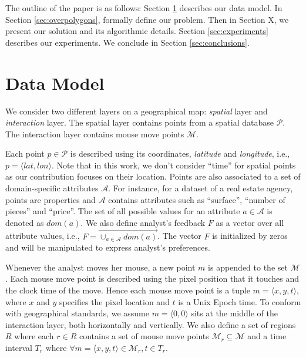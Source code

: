 \documentclass{vldb}
\begin{document}

\vspace{2pt}
The outline of the paper is as follows: Section \ref{sec:datamodel} describes our data model. In Section \ref{sec:overpolygons}, formally define our problem. Then in Section X, we present our solution and its algorithmic details. Section  \ref{sec:experiments} describes our experiments. We conclude in Section \ref{sec:conclusions}.

\section{Data Model}
\label{sec:datamodel}
We consider two different layers on a geographical map: {\em spatial} layer and {\em interaction} layer. The spatial layer contains points from a spatial database $\mathcal{P}$. The interaction layer contains mouse move points $\mathcal{M}$.

\vspace{2pt}
 Each point $p \in \mathcal{P}$ is described using its coordinates, {\em latitude} and {\em longitude}, i.e., $p = \langle \mathit{lat}, \mathit{lon} \rangle$. Note that in this work, we don't consider ``time'' for spatial points as our contribution focuses on their location. Points are also associated to a set of domain-specific attributes $\mathcal{A}$. For instance, for a dataset of a real estate agency, points are properties and $\mathcal{A}$ contains attributes such as ``surface'', ``number of pieces'' and  ``price''. The set of all possible values for an attribute $a \in \mathcal{A}$ is denoted as $dom(a)$. We also define analyst's feedback $F$ as a vector over all attribute values, i.e., $F = \overrightarrow{\cup_{a \in \mathcal{A}}dom(a)}$. The vector $F$ is initialized by zeros and will be manipulated to express analyst's preferences.

\vspace{2pt}
 Whenever the analyst moves her mouse, a new point $m$ is appended to the set $\mathcal{M}$. Each mouse move point is described using the pixel position that it touches and the clock time of the move. Hence each mouse move point is a tuple $m = \langle x, y, t \rangle$, where $x$ and $y$ specifies the pixel location and $t$ is a Unix Epoch time. To conform with geographical standards, we assume $m = \langle 0, 0\rangle$ sits at the middle of the interaction layer, both horizontally and vertically. We also define a set of regions $\mathit{R}$ where each $r \in \mathit{R}$ contains a set of mouse move points $\mathcal{M}_r \subseteq \mathcal{M}$ and a time interval $T_r$ where $\forall m=\langle x,y,t\rangle \in \mathcal{M}_r, t \in T_r$.
\end{document}

